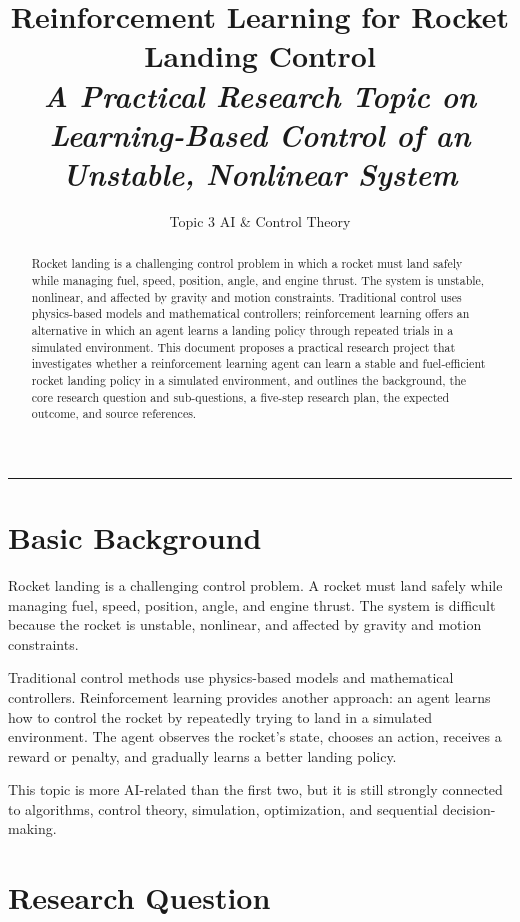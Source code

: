 \documentclass[11pt,a4paper]{article}
\title{\vspace{-0.6in}\bfseries\Large Reinforcement Learning for Rocket Landing Control\\[2pt]
\large\mdseries\itshape A Practical Research Topic on Learning-Based Control of an Unstable, Nonlinear System}
\author[1]{Topic 3 \textbullet{} AI \& Control Theory}
\affil[1]{Practical Algorithm Research Series \textbullet{} 2026}
\date{}
\begin{document}
\maketitle
\thispagestyle{fancy}

\begin{abstract}
\noindent
Rocket landing is a challenging control problem in which a rocket must land safely while managing fuel, speed, position, angle, and engine thrust. The system is unstable, nonlinear, and affected by gravity and motion constraints. Traditional control uses physics-based models and mathematical controllers; reinforcement learning offers an alternative in which an agent learns a landing policy through repeated trials in a simulated environment. This document proposes a practical research project that investigates whether a reinforcement learning agent can learn a stable and fuel-efficient rocket landing policy in a simulated environment, and outlines the background, the core research question and sub-questions, a five-step research plan, the expected outcome, and source references.
\end{abstract}

\noindent\rule{\textwidth}{0.4pt}

\section{Basic Background}

Rocket landing is a challenging control problem. A rocket must land safely while managing fuel, speed, position, angle, and engine thrust. The system is difficult because the rocket is unstable, nonlinear, and affected by gravity and motion constraints.

Traditional control methods use physics-based models and mathematical controllers. Reinforcement learning provides another approach: an agent learns how to control the rocket by repeatedly trying to land in a simulated environment. The agent observes the rocket's state, chooses an action, receives a reward or penalty, and gradually learns a better landing policy.

This topic is more AI-related than the first two, but it is still strongly connected to algorithms, control theory, simulation, optimization, and sequential decision-making.

\section{Research Question}
\end{document}
